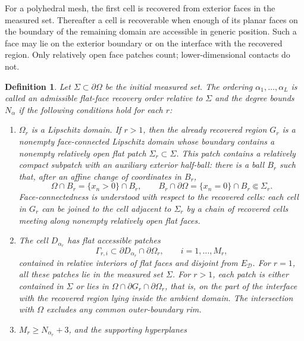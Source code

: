 \documentclass[11pt,oneside]{article}
\newtheorem{definition}[theorem]{Definition}
\begin{document}
For a polyhedral mesh, the first cell is recovered from exterior faces in the
measured set.  Thereafter a cell is recoverable when enough of its planar faces
on the boundary of the remaining domain are accessible in generic position.
Such a face may lie on the exterior boundary or on the interface with the
recovered region.  Only relatively open face patches count; lower-dimensional
contacts do not.


\begin{definition}
\label{def:stripping-order}
Let \(\Sigma\subset\partial\Omega\) be the initial measured set.  The ordering
\(\alpha_1,\ldots,\alpha_L\) is called an admissible flat-face recovery order
relative to \(\Sigma\) and the degree bounds \(N_\alpha\) if the following
conditions hold for each \(r\):
\begin{enumerate}[label=(\roman*)]
  \item \(\Omega_r\) is a Lipschitz domain.  If \(r>1\), then the already
  recovered region \(G_r\) is a nonempty face-connected Lipschitz domain whose
  boundary contains a nonempty relatively open flat patch
  \(\Sigma_r\subset\Sigma\).  This patch contains a relatively compact subpatch
  with an auxiliary exterior half-ball: there is a ball \(B_r\) such that, after
  an affine change of coordinates in \(B_r\),
  \begin{equation}
    \Omega\cap B_r=\{x_n>0\}\cap B_r,
    \qquad
    B_r\cap\partial\Omega=\{x_n=0\}\cap B_r\Subset\Sigma_r .
  \end{equation}
  Face-connectedness is understood with respect to the recovered cells: each
  cell in \(G_r\) can be joined to the cell adjacent to \(\Sigma_r\) by a chain
  of recovered cells meeting along nonempty relatively open flat faces.
  \item The cell \(D_{\alpha_r}\) has flat accessible patches
  \begin{equation}
    \Gamma_{r,i}\subset \partial D_{\alpha_r}\cap\partial\Omega_r,
    \qquad i=1,\ldots,M_r,
  \end{equation}
  contained in relative interiors of flat faces and disjoint from
  \(E_{\mathcal D}\).  For \(r=1\), all these
  patches lie in the measured set \(\Sigma\).  For \(r>1\), each patch
  is either contained in \(\Sigma\) or lies in
  \(\Omega\cap\partial G_r\cap\partial\Omega_r\), that is, on the part of the
  interface with the recovered region lying inside the ambient domain.  The
  intersection with \(\Omega\) excludes any common outer-boundary rim.
  \item \(M_r\ge N_{\alpha_r}+3\), and the supporting hyperplanes

\end{enumerate}
\end{definition}
\end{document}
